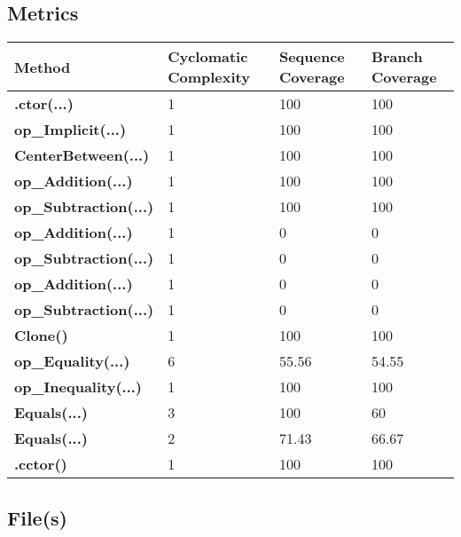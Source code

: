 \documentclass[a4paper,10pt]{article}
\begin{document}
\subsection{Metrics}
\begin{longtable}[l]{|l|l|l|l|}
\hline
\textbf{Method} & \textbf{Cyclomatic Complexity} & \textbf{Sequence Coverage} & \textbf{Branch Coverage}\\
\hline
\textbf{.ctor(...)} & 1 & 100 & 100\\
\hline
\textbf{op\_Implicit(...)} & 1 & 100 & 100\\
\hline
\textbf{CenterBetween(...)} & 1 & 100 & 100\\
\hline
\textbf{op\_Addition(...)} & 1 & 100 & 100\\
\hline
\textbf{op\_Subtraction(...)} & 1 & 100 & 100\\
\hline
\textbf{op\_Addition(...)} & 1 & 0 & 0\\
\hline
\textbf{op\_Subtraction(...)} & 1 & 0 & 0\\
\hline
\textbf{op\_Addition(...)} & 1 & 0 & 0\\
\hline
\textbf{op\_Subtraction(...)} & 1 & 0 & 0\\
\hline
\textbf{Clone()} & 1 & 100 & 100\\
\hline
\textbf{op\_Equality(...)} & 6 & 55.56 & 54.55\\
\hline
\textbf{op\_Inequality(...)} & 1 & 100 & 100\\
\hline
\textbf{Equals(...)} & 3 & 100 & 60\\
\hline
\textbf{Equals(...)} & 2 & 71.43 & 66.67\\
\hline
\textbf{.cctor()} & 1 & 100 & 100\\
\hline
\end{longtable}
\subsection{File(s)}
\end{document}
